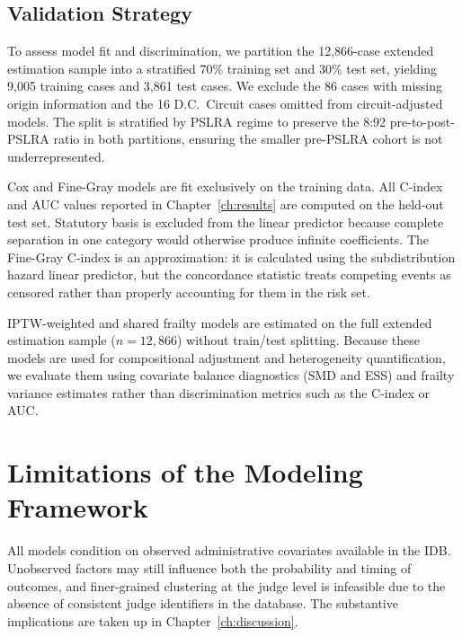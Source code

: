 \subsection{Validation Strategy}

To assess model fit and discrimination, we partition the
12,866-case extended estimation sample into a stratified
70\% training set and 30\% test set, yielding 9,005 training
cases and 3,861 test cases. We exclude the 86 cases with
missing origin information and the 16 D.C.\ Circuit cases
omitted from circuit-adjusted models. The split is stratified
by PSLRA regime to preserve the 8:92 pre-to-post-PSLRA ratio
in both partitions, ensuring the smaller pre-PSLRA cohort is
not underrepresented.

Cox and Fine-Gray models are fit exclusively on the training
data. All C-index and AUC values reported in
Chapter~\ref{ch:results} are computed on the held-out test
set. Statutory basis is excluded from the linear predictor
because complete separation in one category would otherwise
produce infinite coefficients. The Fine-Gray C-index is an
approximation: it is calculated using the subdistribution
hazard linear predictor, but the concordance statistic treats
competing events as censored rather than properly accounting
for them in the risk set.

IPTW-weighted and shared frailty models are estimated on the
full extended estimation sample ($n = 12{,}866$) without
train/test splitting. Because these models are used for
compositional adjustment and heterogeneity quantification,
we evaluate them using covariate balance diagnostics
(SMD and ESS) and frailty variance estimates rather than
discrimination metrics such as the C-index or AUC.

\section{Limitations of the Modeling Framework}

All models condition on observed administrative covariates available in the IDB. Unobserved factors may still influence both the probability and timing of outcomes, and finer-grained clustering at the judge level is infeasible due to the absence of consistent judge identifiers in the database. The substantive implications are taken up in Chapter~\ref{ch:discussion}.
